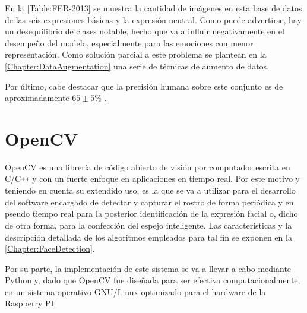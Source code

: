 En la \autoref{Table:FER-2013} se muestra la cantidad de imágenes en esta base de datos de las seis expresiones básicas y la expresión neutral. Como puede advertirse, hay un desequilibrio de clases notable, hecho que va a influir negativamente en el desempeño del modelo, especialmente para las emociones con menor representación. Como solución parcial a este problema se plantean en la \autoref{Chapter:DataAugmentation} una serie de técnicas de aumento de datos.

Por último, cabe destacar que la precisión humana sobre este conjunto es de aproximadamente $65\pm 5\%$ \cite{FER-2013_human_acc}.

\section{OpenCV} \label{Chapter:OpenCV}

OpenCV es una librería de código abierto de visión por computador escrita en C\slash C\texttt{++} y con un fuerte enfoque en aplicaciones en tiempo real. Por este motivo y teniendo en cuenta su extendido uso, es la que se va a utilizar para el desarrollo del software encargado de detectar y capturar el rostro de forma periódica y en pseudo tiempo real para la posterior identificación de la expresión facial o, dicho de otra forma, para la confección del espejo inteligente. Las características y la descripción detallada de los algoritmos empleados para tal fin se exponen en la \autoref{Chapter:FaceDetection}.

Por su parte, la implementación de este sistema se va a llevar a cabo mediante Python y, dado que OpenCV fue diseñada para ser efectiva computacionalmente, en un sistema operativo GNU/Linux optimizado para el hardware de la Raspberry PI.
